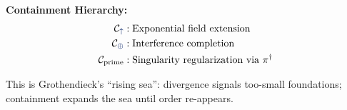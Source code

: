 \textbf{Containment Hierarchy:}
\begin{align}
\mathcal{C}_{\grow} &: \text{Exponential field extension} \\
\mathcal{C}_{\fuse} &: \text{Interference completion} \\
\mathcal{C}_{\text{prime}} &: \text{Singularity regularization via } \pi^\dagger
\end{align}

This is Grothendieck's ``rising sea'': divergence signals too-small
foundations; containment expands the sea until order re-appears.


